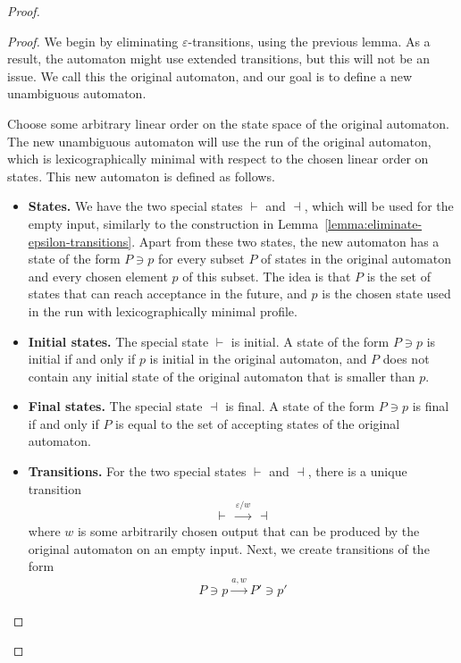 \begin{proof}
    \begin{proof}
        We begin by eliminating $\varepsilon$-transitions, using the previous lemma. As a result, the automaton might use extended transitions, but this  will not be an issue. We call this the original automaton, and our goal is to define a new unambiguous automaton. 
        
        Choose some arbitrary linear order on the state space of the original automaton. The new unambiguous automaton will use the run of the original automaton, which is lexicographically minimal with respect to the chosen linear order on states. This new automaton is defined as follows.  
        \begin{itemize}
            \item \textbf{States.} We have the two special states $\vdash$ and $\dashv$, which will be used for the empty input, similarly to the construction in Lemma~\ref{lemma:eliminate-epsilon-transitions}. Apart from these two states, the new automaton has a state  of the form    $P \ni p$ for every subset  $P$ of states in the original automaton and every chosen element $p$ of this subset.  The  idea is that $P$ is the set of states that can reach acceptance in the future, and $p$ is the chosen state used in the run with lexicographically minimal profile.
            \item \textbf{Initial states.} The special state $\vdash$ is initial.  A state  of the form  $P \ni p$ is initial  if and only if  $p$ is initial in the original automaton, and $P$ does not contain any initial state of the original automaton that is smaller than $p$.
            \item \textbf{Final states.} The special state $\dashv$ is final.  A state of the form $P \ni p$ is final  if and only if  $P$ is equal to the set of accepting states of the original automaton.
            \item \textbf{Transitions.} For the two special states $\vdash$ and $\dashv$, there is a unique transition 
            \begin{align*}
            \vdash \ \xrightarrow{ \varepsilon / w} \ \dashv
            \end{align*}
            where $w$ is some arbitrarily chosen output that can be produced by the original automaton on an empty input. Next, we create transitions of the form 
        \begin{align*}
        P \ni p
        \xrightarrow {a,w}
        P' \ni p'

\end{align*}
\end{itemize}
\end{proof}
\end{proof}

